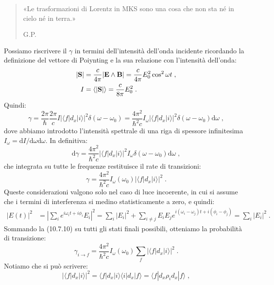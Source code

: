 \documentclass[10pt,a4paper]{report}
\theoremstyle{definition}
\numberwithin{equation}{section}
\newcommand{\diff}[1][]{\mathrm{d}#1}
\newcommand{\bra}{\langle}
\newcommand{\ket}{\rangle}
\begin{document}
\begin{quote}
«Le trasformazioni di Lorentz in MKS sono una cosa che non sta né in cielo né in terra.»
\begin{flushright}
G.P.
\end{flushright}
\end{quote}
Possiamo riscrivere il $\gamma$ in termini dell'intensità dell'onda incidente ricordando la definizione del vettore di Poiynting e la sua relazione con l'intensità dell'onda:
\begin{align}
|\mathbf{S}| &= \frac{c}{4\pi}|\mathbf{E}\wedge\mathbf{B}|=\frac{c}{4\pi}E_0^2\cos^2\omega t \notag\;, \\
I&=\bra |\mathbf{S}|\ket=\frac{c}{8\pi}E_0^2\;.
\end{align}
Quindi:
\begin{equation}
\gamma=\frac{2\pi}{\hbar}\frac{2\pi}{c}I|\bra f|d_x|i\ket|^2\delta(\omega-\omega_0)=\frac{4\pi^2}{\hbar^2c}I_{\omega}|\bra f|d_x|i\ket|^2\delta(\omega-\omega_0)\diff{\omega}\;,
\end{equation}
dove abbiamo introdotto l'intensità spettrale di una riga di spessore infinitesima $I_{\omega}=\diff{I}/\diff{\omega}\diff{\omega}$. In definitiva:
\begin{equation}
\diff{\gamma}=\frac{4\pi^2}{\hbar^2c}|\bra f|d_x|i\ket|^2I_{\omega}\delta(\omega-\omega_0)\diff{\omega}\;,
\end{equation}
che integrata su tutte le frequenze restituisce il rate di transizioni:
\begin{equation}
\gamma=\frac{4\pi^2}{\hbar^2 c}I_{\omega}(\omega_0)|\bra f|d_x|i\ket|^2\;.
\end{equation}
Queste considerazioni valgono solo nel caso di luce incoerente, in cui si assume che i termini di interferenza si medino statisticamente a zero, e quindi:
\begin{align}
|E(t)|^2 &= \left|\sum_i e^{i\omega_it+i\phi_i}E_i\right|^2= \sum_i |E_i|^2+\sum_{i\ne j} E_iE_j e^{i(\omega_i-\omega_j)t+i(\phi_i-\phi_j)}=  \sum_i |E_i|^2\;.
\end{align}
Sommando la (10.7.10) su tutti gli stati finali possibili, otteniamo la probabilità di transizione:
\begin{equation}
\gamma_{i\to f}=\frac{4\pi^2}{\hbar^2 c}I_{\omega}(\omega_0)\sum_f |\bra f|d_x|i\ket|^2\;.
\end{equation}
Notiamo che si può scrivere:
\begin{equation}
|\bra f|d_x|i\ket|^2=\bra f|d_x|i\ket\bra i|d_x|f\ket=\bra f|d_x \rho_i d_x|f\ket\;,
\end{equation}
\end{document}
